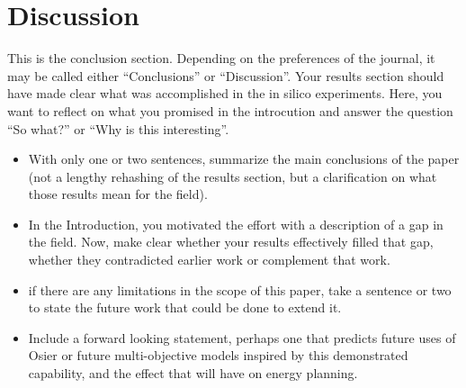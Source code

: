 \section{Discussion}
This is the conclusion section. Depending on the preferences of the journal, it 
may be called either ``Conclusions'' or ``Discussion''. 
Your results section should have made clear what was accomplished in the in 
silico experiments. Here, you want to reflect on what you promised in the 
introcution and answer the question ``So what?'' or ``Why is this 
interesting''.

\begin{itemize}
        \item With only one or two sentences, summarize the main conclusions of 
                the paper (not a lengthy rehashing of the results section, but 
                a clarification on what those results mean for the field). 
        \item In the Introduction, you motivated the effort with a description 
                of a gap in the field. Now, make clear whether your results 
                effectively filled that gap, whether they contradicted earlier 
                work or complement that work. 
        \item if there are any limitations in the scope of this paper, take a 
                sentence or two to state the future work that could be done to 
                extend it. 
        \item Include a forward looking statement, perhaps one that predicts 
                future uses of Osier or future multi-objective models inspired 
                by this demonstrated capability, and the effect that will have on energy 
                planning.  
\end{itemize}
